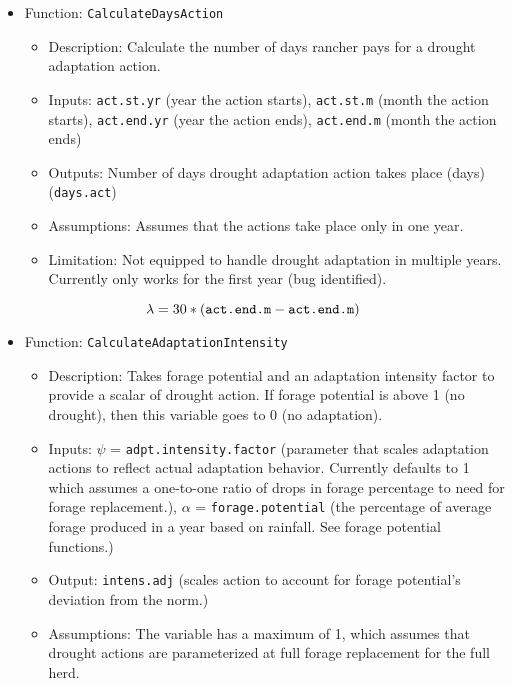 \documentclass[11pt]{article}
\begin{document}
\begin{itemize}
\item Function: \verb!CalculateDaysAction!
	\begin{itemize}
	\item Description: Calculate the number of days rancher pays for a drought adaptation action. 
	\item Inputs: \verb!act.st.yr! (year the action starts), \verb!act.st.m! (month the action starts), \verb!act.end.yr! (year the action ends), \verb!act.end.m! (month the action ends)
	\item Outputs: Number of days drought adaptation action takes place (days) (\verb!days.act!)
	\item Assumptions: Assumes that the actions take place only in one year.
	\item Limitation: Not equipped to handle drought adaptation in multiple years. Currently only works for the first year (bug identified).
	\end{itemize}
\end{itemize}

\begin{equation} \label{days}
\lambda = 30 * (\verb!act.end.m! - \verb!act.end.m!)
\end{equation}

\begin{itemize}
\item Function: \verb!CalculateAdaptationIntensity!
	\begin{itemize}
	\item Description: Takes forage potential and an adaptation intensity factor to provide a scalar of drought action. If forage potential is above 1 (no drought), then this variable goes to 0 (no adaptation). 
	\item Inputs: \(\psi\) = \verb!adpt.intensity.factor! (parameter that scales adaptation actions to reflect actual adaptation behavior. Currently defaults to 1 which assumes a one-to-one ratio of drops in forage percentage to need for forage replacement.), \(\alpha\) = \verb!forage.potential! (the percentage of average forage produced in a year based on rainfall. See forage potential functions.)
	\item Output: \verb!intens.adj! (scales action to account for forage potential's deviation from the norm.)
	\item Assumptions: The variable has a maximum of 1, which assumes that drought actions are parameterized at full forage replacement for the full herd.
	\end{itemize}
\end{itemize}
\end{document}
